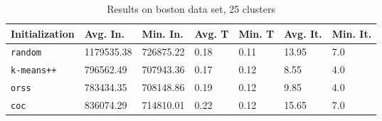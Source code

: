 \begin{table}[h]
	\begin{center}
		\begin{tabular}{|l|l|l|l|l|l|l|}
			\hline
			Initialization & Avg. In. & Min. In. & Avg. T & Min. T & Avg. It. & Min. It.\\\hline
			\texttt{random} & 1179535.38 & 726875.22 & 0.18 & 0.11 & 13.95 & 7.0\\\hline
			\texttt{k-means++} & 796562.49 & 707943.36 & 0.17 & 0.12 & 8.55 & 4.0\\\hline
			\texttt{orss} & 783434.35 & 708148.86 & 0.19 & 0.12 & 9.85 & 4.0\\\hline
			\texttt{coc} & 836074.29 & 714810.01 & 0.22 & 0.12 & 15.65 & 7.0\\\hline
		\end{tabular}
		\caption{Results on boston data set, 25 clusters}
		\label{tbl:boston25}
	\end{center}
\end{table}


